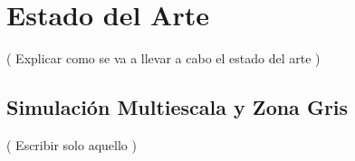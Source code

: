\chapter{Estado del Arte}

( Explicar como se va a llevar a cabo el estado del arte )

\newpage
\section{Simulación Multiescala y Zona Gris}


( Escribir solo aquello )


